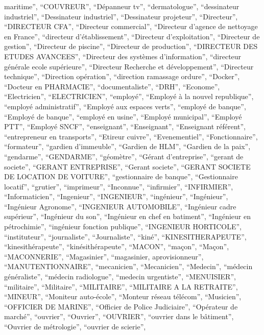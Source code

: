\documentclass[
  letterpaper,
  DIV=11,
  numbers=noendperiod]{scrartcl}
\begin{document}
\begin{itemize}
  maritime'', ``COUVREUR'', ``Dépanneur tv'', ``dermatologue'',
  ``dessinateur industriel'', ``Dessinateur industriel'', ``Dessinateur
  projeteur'', ``Directeur'', ``DIRECTEUR CFA'', ``Directeur
  commercial'', ``Directeur d'agence de nettoyage en France'',
  ``directeur d'établissement'', ``Directeur d'exploitation'',
  ``Directeur de gestion'', ``Directeur de piscine'', ``Directeur de
  production'', ``DIRECTEUR DES ETUDES AVANCEES'', ``Directeur des
  systèmes d'information'', ``directeur générale ecole supérieure'',
  ``Directeur Recherche et développement'', ``Directeur technique'',
  ``Direction opération'', ``direction ramassage ordure'', ``Docker'',
  ``Docteur en PHARMACIE'', ``documentaliste'', ``DRH'', ``Econome'',
  ``Electricien'', ``ELECTRICIEN'', ``employé'', ``Employé à la nouvel
  republique'', ``employé administratif'', ``Employé aux espaces
  verts'', ``employé de banque'', ``Employé de banque'', ``employé en
  usine'', ``Employé municipal'', ``Employé PTT'', ``Employé SNCF'',
  ``enseignant'', ``Enseignant'', ``Enseignant référent'',
  ``entrepreneur en transports'', ``Etireur cuivre'', ``Evenementiel'',
  ``Fonctionnaire'', ``formateur'', ``gardien d'immeuble'', ``Gardien de
  HLM'', ``Gardien de la paix'', ``gendarme'', ``GENDARME'',
  ``géomètre'', ``Gérant d'entreprise'', ``gerant de societe'', ``GERANT
  ENTREPRISE'', ``Gerant societe'', ``GERANT SOCIETE DE LOCATION DE
  VOITURE'', ``gestionnaire de banque'', ``Gestionnaire locatif'',
  ``grutier'', ``imprimeur'', ``Inconnue'', ``infirmier'',
  ``INFIRMIER'', ``Informaticien'', ``Ingenieur'', ``INGENIEUR'',
  ``ingénieur'', ``Ingénieur'', ``Ingénieur Agronome'', ``INGENIEUR
  AUTOMOBILE'', ``Ingénieur cadre supérieur'', ``Ingénieur du son'',
  ``Ingénieur en chef en batiment'', ``Ingénieur en pétrochimie'',
  ``ingénieur fonction publique'', ``INGENIEUR HORTICOLE'',
  ``instituteur'', ``journaliste'', ``Journaliste'', ``kiné'',
  ``KINESITHERAPEUTE'', ``kinesithérapeute'', ``kinésithérapeute'',
  ``MACON'', ``maçon'', ``Maçon'', ``MACONNERIE'', ``Magasinier'',
  ``magasinier, aprovisionneur'', ``MANUTENTIONNAIRE'', ``mecanicien'',
  ``Mecanicien'', ``Medecin'', ``médecin généraliste'', ``médecin
  radiologue'', ``medecin urgentiste'', ``MENUISIER'', ``militaire'',
  ``Militaire'', ``MILITAIRE'', ``MILITAIRE A LA RETRAITE'', ``MINEUR'',
  ``Moniteur auto-école'', ``Monteur réseau télécom'', ``Musicien'',
  ``OFFICIER DE MARINE'', ``Officier de Police Judiciaire'', ``Opérateur
  de marché'', ``ouvrier'', ``Ouvrier'', ``OUVRIER'', ``ouvrier dans le
  bâtiment'', ``Ouvrier de métrologie'', ``ouvrier de scierie'',

\end{itemize}
\end{document}
